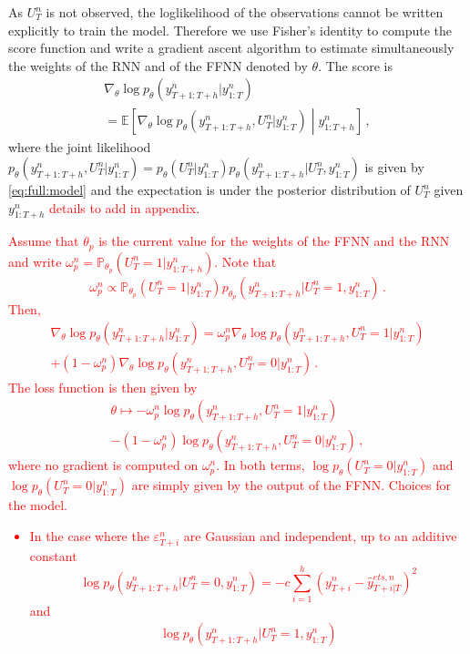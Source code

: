 \documentclass[letterpaper]{article} %
\newcommand{\ts}{y}
\newcommand{\etspred}{\hat{y}}
\begin{document}
As $U^n_T$ is not observed, the loglikelihood of the observations cannot be written explicitly to train the model. Therefore we use Fisher's identity to compute the score function and write a gradient ascent algorithm to estimate simultaneously the weights of the RNN and of the FFNN denoted by $\theta$. The score is
\begin{multline*}
\nabla_\theta \log p_\theta(\ts^n_{T+1:T+h}|\ts^n_{1:T})
\\ = \mathbb{E}\left[\nabla_\theta \log p_\theta(\ts^n_{T+1:T+h},U_T^n|\ts^n_{1:T})\middle|\ts^n_{1:T+h}\right]\,,
\end{multline*}
where the joint likelihood $p_\theta(\ts^n_{T+1:T+h},U_T^n|\ts^n_{1:T}) = p_\theta(U_T^n|\ts^n_{1:T})p_\theta(\ts^n_{T+1:T+h}|U_T^n,\ts^n_{1:T})$ is given by \eqref{eq:full:model} and the expectation is under the posterior distribution of $U_T^n$ given $\ts^n_{1:T+h}$  \textcolor{red}{details to add in appendix}. \textcolor{red}{Assume that $\theta_p$ is the current value for the weights of the FFNN and the RNN and write $\omega_p^n = \mathbb{P}_{\theta_p}(U_T^n = 1|\ts^n_{1:T+h})$. Note that
$$
\omega_p^n \propto \mathbb{P}_{\theta_p}(U_T^n = 1|\ts^n_{1:T})p_{\theta_p}(\ts^n_{T+1:T+h}|U_T^n=1,\ts^n_{1:T})\,.
$$
Then,
\begin{multline*}
\nabla_\theta \log p_\theta(\ts^n_{T+1:T+h}|\ts^n_{1:T}) = \omega_p^n\nabla_\theta \log p_\theta(\ts^n_{T+1:T+h},U_T^n=1|\ts^n_{1:T})\\
+ (1-\omega_p^n)\nabla_\theta \log p_\theta(\ts^n_{T+1:T+h},U_T^n=0|\ts^n_{1:T})\,.
\end{multline*}
The loss function is then given by
\begin{multline*}
\theta\mapsto - \omega_p^n \log p_\theta(\ts^n_{T+1:T+h},U_T^n=1|\ts^n_{1:T})\\
- (1-\omega_p^n) \log p_\theta(\ts^n_{T+1:T+h},U_T^n=0|\ts^n_{1:T})\,,
\end{multline*} 
where no gradient is computed on $\omega_p^n$. In both terms, $\log p_\theta(U_T^n=0|\ts^n_{1:T})$ and $\log p_\theta(U_T^n=0|\ts^n_{1:T})$ are simply given by the output of the FFNN.  Choices for the model.
\begin{itemize}
\item In the case where the  $\varepsilon^n_{T+i}$ are Gaussian and independent, up to an additive constant
$$
\log p_\theta(\ts^n_{T+1:T+h}|U_T^n=0,\ts^n_{1:T}) = -c\sum_{i=1}^{h}(\ts^n_{T+i}  - \etspred^{ets,n}_{T+i|T})^2
$$
and
\begin{multline*}
\log p_\theta(\ts^n_{T+1:T+h}|U_T^n=1,\ts^n_{1:T})\\

\end{multline*}
\end{itemize}}
\end{document}
